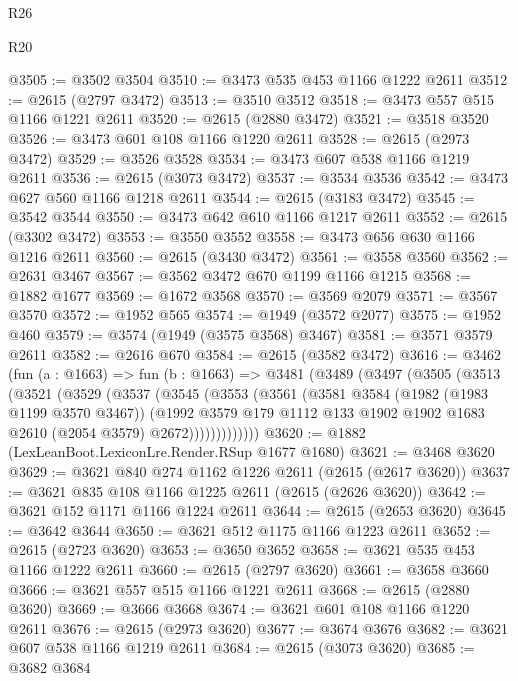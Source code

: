 \begin{lexlean}{R26}
\begin{lexlean}{R20}
\begin{coremodule}
{{{{{{{{{{{{{{{{{{{{{{{{{{{{{{{{{{{{{{{{{{{{{{{{{{{{{{{{{{{{{{{@3505 := @3502 @3504
@3510 := @3473 @535 @453 @1166 @1222 @2611
@3512 := @2615 (@2797 @3472)
@3513 := @3510 @3512
@3518 := @3473 @557 @515 @1166 @1221 @2611
@3520 := @2615 (@2880 @3472)
@3521 := @3518 @3520
@3526 := @3473 @601 @108 @1166 @1220 @2611
@3528 := @2615 (@2973 @3472)
@3529 := @3526 @3528
@3534 := @3473 @607 @538 @1166 @1219 @2611
@3536 := @2615 (@3073 @3472)
@3537 := @3534 @3536
@3542 := @3473 @627 @560 @1166 @1218 @2611
@3544 := @2615 (@3183 @3472)
@3545 := @3542 @3544
@3550 := @3473 @642 @610 @1166 @1217 @2611
@3552 := @2615 (@3302 @3472)
@3553 := @3550 @3552
@3558 := @3473 @656 @630 @1166 @1216 @2611
@3560 := @2615 (@3430 @3472)
@3561 := @3558 @3560
@3562 := @2631 @3467
@3567 := @3562 @3472 @670 @1199 @1166 @1215
@3568 := @1882 @1677
@3569 := @1672 @3568
@3570 := @3569 @2079
@3571 := @3567 @3570
@3572 := @1952 @565
@3574 := @1949 (@3572 @2077)
@3575 := @1952 @460
@3579 := @3574 (@1949 (@3575 @3568) @3467)
@3581 := @3571 @3579 @2611
@3582 := @2616 @670
@3584 := @2615 (@3582 @3472)
@3616 := @3462
    (fun (a : @1663) =>
    fun (b : @1663) =>
    @3481
      (@3489
        (@3497
          (@3505
            (@3513
              (@3521
                (@3529
                  (@3537
                    (@3545
                      (@3553
                        (@3561
                          (@3581
                            @3584
                            (@1982 (@1983 @1199 @3570 @3467))
                            (@1992
                              @3579
                              @179
                              @1112
                              @133
                              @1902
                              @1902
                              @1683
                              @2610
                              (@2054 @3579)
                              @2672)))))))))))))
@3620 := @1882 (LexLeanBoot.LexiconLre.Render.RSup @1677 @1680)
@3621 := @3468 @3620
@3629 := @3621 @840 @274 @1162 @1226 @2611 (@2615 (@2617 @3620))
@3637 := @3621 @835 @108 @1166 @1225 @2611 (@2615 (@2626 @3620))
@3642 := @3621 @152 @1171 @1166 @1224 @2611
@3644 := @2615 (@2653 @3620)
@3645 := @3642 @3644
@3650 := @3621 @512 @1175 @1166 @1223 @2611
@3652 := @2615 (@2723 @3620)
@3653 := @3650 @3652
@3658 := @3621 @535 @453 @1166 @1222 @2611
@3660 := @2615 (@2797 @3620)
@3661 := @3658 @3660
@3666 := @3621 @557 @515 @1166 @1221 @2611
@3668 := @2615 (@2880 @3620)
@3669 := @3666 @3668
@3674 := @3621 @601 @108 @1166 @1220 @2611
@3676 := @2615 (@2973 @3620)
@3677 := @3674 @3676
@3682 := @3621 @607 @538 @1166 @1219 @2611
@3684 := @2615 (@3073 @3620)
@3685 := @3682 @3684
}}}}}}}}}}}}}}}}}}}}}}}}}}}}}}}}}}}}}}}}}}}}}}}}}}}}}}}}}}}}}}}
\end{coremodule}
\end{lexlean}
\end{lexlean}
